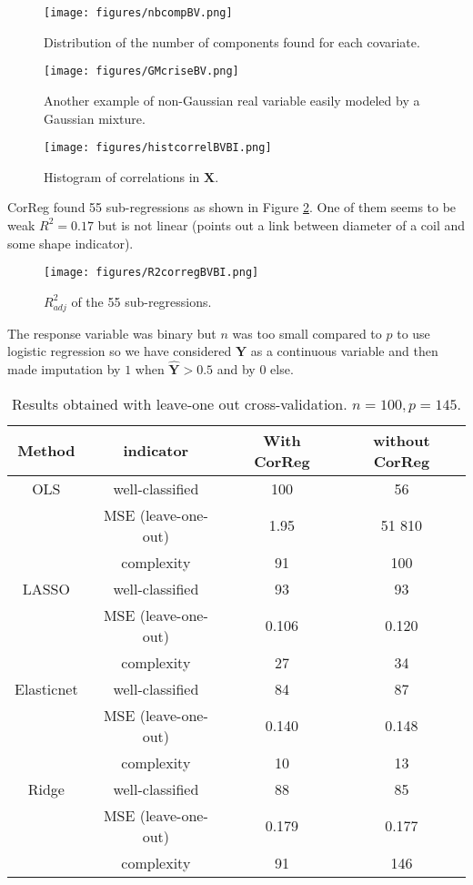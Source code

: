 \documentclass[12pt,a4paper]{report}
\begin{document}
		
		\begin{figure}[h!]
	\begin{minipage}[t]{.30\linewidth}
			\texttt{[image: figures/nbcompBV.png]}%
			\caption{Distribution of the number of components found for each covariate.}\label{graphMixmod}
	\end{minipage} \hfill
	\begin{minipage}[t]{.30\linewidth}
			\texttt{[image: figures/GMcriseBV.png]}%
			\caption{Another example of non-Gaussian real variable easily modeled by a Gaussian mixture.}
	\end{minipage} \hfill
   \begin{minipage}[t]{.30\linewidth}
			\texttt{[image: figures/histcorrelBVBI.png]} 
			\caption{Histogram of correlations in $\boldsymbol{X}$.} \label{compareMSEexfos}
   \end{minipage}
\end{figure} 
  		
  			
CorReg found 55 sub-regressions as shown in Figure \ref{R2bv}. One of them seems to be weak $R^2=0.17$ but is not linear (points out a link between diameter of a coil and some shape indicator).	

\begin{figure}[h!]
\centering
	\texttt{[image: figures/R2corregBVBI.png]} 
			\caption{$R^2_{adj}$ of the 55 sub-regressions.}\label{R2bv}
\end{figure}
The response variable was binary but $n$ was too small compared to $p$ to use logistic regression so we have considered $\boldsymbol{Y}$ as a continuous variable and then made imputation by $1$ when $\hat{\boldsymbol{Y}}>0.5$ and by $0$ else.


\begin{table}[h!]
\centering
\begin{tabular}{|c c|c|c|}
	\hline 
	Method& indicator& With CorReg & without CorReg \\ 
	\hline
	OLS & well-classified & 100& 56 \\
		& MSE (leave-one-out)& 1.95& 51 810\\
		& complexity & 91& 100 \\
	\hline 
		LASSO & well-classified &93 &93 \\
		& MSE (leave-one-out)& 0.106 & 0.120\\
		& complexity & 27&34\\
	\hline 
		Elasticnet & well-classified &84 &87 \\
		& MSE (leave-one-out)&0.140 &0.148\\
		& complexity &10 &13\\
	\hline 
		Ridge & well-classified &88 &85 \\
		& MSE (leave-one-out)& 0.179 & 0.177\\
		& complexity &91 &146\\
	\hline 
\end{tabular} 
\caption{Results obtained with leave-one out cross-validation. $n=100, p=145$.}	
\end{table}
\end{document}
